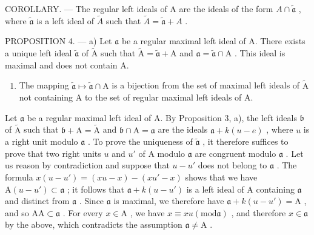 COROLLARY. --- The regular left ideals of A are the ideals of the form \(A \cap \widetilde{\mathfrak{a}}\) , where \(\widetilde{\mathfrak{a}}\) is a left ideal of \(\widetilde{A}\) such that \(\widetilde{A} = \widetilde{\mathfrak{a}} + A\) .

PROPOSITION 4. --- a) Let \(\mathfrak{a}\) be a regular maximal left ideal of A. There exists a unique left ideal \(\widetilde{\mathfrak{a}}\) of \(\widetilde{\mathrm{A}}\) such that \(\widetilde{\mathrm{A}} = \widetilde{\mathfrak{a}} + \mathrm{A}\) and \(\mathfrak{a} = \widetilde{\mathfrak{a}} \cap \mathrm{A}\) . This ideal is maximal and does not contain A.

\begin{enumerate}
\def\labelenumi{\alph{enumi})}
\setcounter{enumi}{1}
\tightlist
\item
  The mapping \(\widetilde{\mathfrak{a}}\mapsto \widetilde{\mathfrak{a}}\cap \mathrm{A}\) is a bijection from the set of maximal left ideals of \(\widetilde{\mathrm{A}}\) not containing A to the set of regular maximal left ideals of A.
\end{enumerate}

Let \(\mathfrak{a}\) be a regular maximal left ideal of A. By Proposition 3, a), the left ideals \(\mathfrak{b}\) of \(\widetilde{\mathrm{A}}\) such that \(\mathfrak{b} + \mathrm{A} = \widetilde{\mathrm{A}}\) and \(\mathfrak{b} \cap \mathrm{A} = \mathfrak{a}\) are the ideals \(\mathfrak{a} + k(u - e)\) , where \(u\) is a right unit modulo \(\mathfrak{a}\) . To prove the uniqueness of \(\widetilde{\mathfrak{a}}\) , it therefore suffices to prove that two right units \(u\) and \(u'\) of A modulo \(\mathfrak{a}\) are congruent modulo \(\mathfrak{a}\) . Let us reason by contradiction and suppose that \(u - u'\) does not belong to \(\mathfrak{a}\) . The formula \(x(u - u') = (xu - x) - (xu' - x)\) shows that we have \(\mathrm{A}(u - u') \subset \mathfrak{a}\) ; it follows that \(\mathfrak{a} + k(u - u')\) is a left ideal of A containing \(\mathfrak{a}\) and distinct from \(\mathfrak{a}\) . Since \(\mathfrak{a}\) is maximal, we therefore have \(\mathfrak{a} + k(u - u') = \mathrm{A}\) , and so \(\mathrm{AA} \subset \mathfrak{a}\) . For every \(x \in \mathrm{A}\) , we have \(x \equiv xu (\mathrm{mod} \mathfrak{a})\) , and therefore \(x \in \mathfrak{a}\) by the above, which contradicts the assumption \(\mathfrak{a} \neq \mathrm{A}\) .

